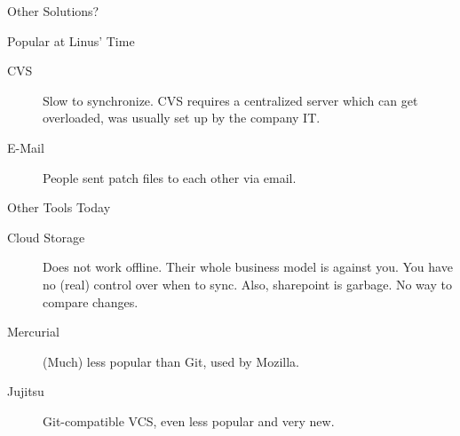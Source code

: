 \documentclass[xetex]{beamer}
\begin{document}
\begin{frame}{Other Solutions?}
  \begin{block}{Popular at Linus' Time}
    \begin{description}
      \item[CVS] Slow to synchronize. CVS requires a centralized server which
        can get overloaded, was usually set up by the company IT.
      \item[E-Mail] People sent patch files to each other via email.
    \end{description}
  \end{block}
  \begin{block}{Other Tools Today}
    \begin{description}
      \item[Cloud Storage] Does not work offline. Their whole business model is
        against you. You have no (real) control over when to sync. Also,
        sharepoint is garbage. No way to compare changes.

      \item[Mercurial] (Much) less popular than Git, used by Mozilla.

      \item[Jujitsu] Git-compatible VCS, even less popular and very new.
    \end{description}
  \end{block}
\end{frame}
\end{document}
